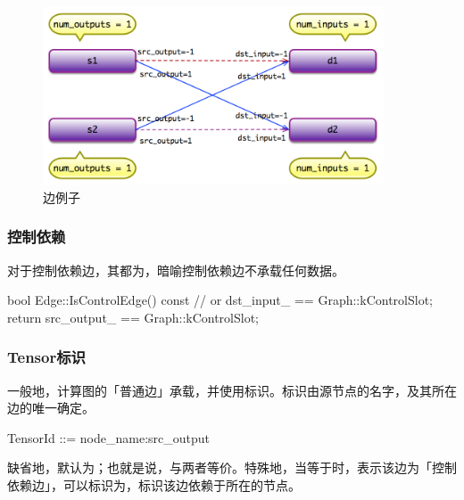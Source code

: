 \begin{content}
\begin{figure}[!htbp]
\centering
\includegraphics[width=0.9\textwidth]{figures/cc-edge-model-example.png}
\caption{边例子}
 \label{fig:cc-edge-model-example}
\end{figure}

\subsubsection{控制依赖}

对于控制依赖边，其都为，暗喻控制依赖边不承载任何数据。

\begin{leftbar}
\begin{c++}
bool Edge::IsControlEdge() const {
   // or dst\_input\_ == Graph::kControlSlot;
   return src_output_ == Graph::kControlSlot;
}
\end{c++}
\end{leftbar}

\subsubsection{Tensor标识}

一般地，计算图的「普通边」承载，并使用标识。标识由源节点的名字，及其所在边的唯一确定。

\begin{leftbar}
\begin{c++}
TensorId ::= node_name:src_output
\end{c++}
\end{leftbar}

缺省地，默认为；也就是说，与两者等价。特殊地，当等于时，表示该边为「控制依赖边」，可以标识为，标识该边依赖于所在的节点。


\end{content}
